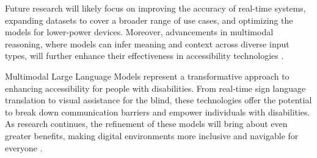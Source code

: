 Future research will likely focus on improving the accuracy of real-time systems, expanding datasets to cover a broader range of use cases, and optimizing the models for lower-power devices. Moreover, advancements in multimodal reasoning, where models can infer meaning and context across diverse input types, will further enhance their effectiveness in accessibility technologies \cite{vs2023chen}.


Multimodal Large Language Models represent a transformative approach to enhancing accessibility for people with disabilities. From real-time sign language translation to visual assistance for the blind, these technologies offer the potential to break down communication barriers and empower individuals with disabilities. As research continues, the refinement of these models will bring about even greater benefits, making digital environments more inclusive and navigable for everyone \cite{vs2024yang,vs2024song,vs2024li}.






